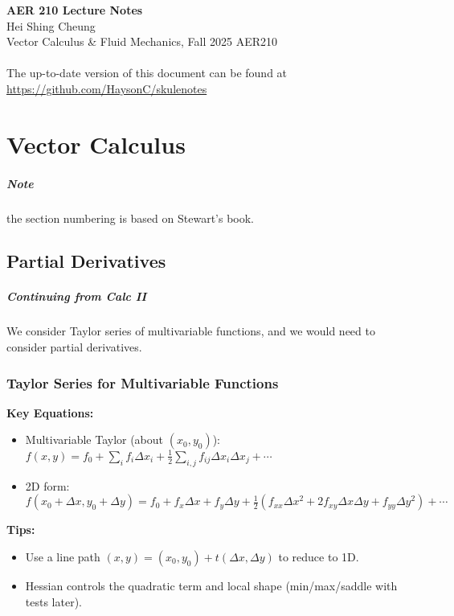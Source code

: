 \documentclass[11pt]{report}
\begin{document}
\thispagestyle{empty}
{\LARGE \bf AER 210 Lecture Notes}\\
{\large Hei Shing Cheung}\\
Vector Calculus \& Fluid Mechanics, Fall 2025 \hfill AER210\\
\\
The up-to-date version of this document can be found at \url{https://github.com/HaysonC/skulenotes}\\

\chapter{Vector Calculus}

\setcounter{section}{13}
\paragraph{Note} the section numbering is based on Stewart's book.

\section{Partial Derivatives}
\paragraph{Continuing from Calc II} We consider Taylor series of multivariable functions, and we would need to consider partial derivatives.

\subsection{Taylor Series for Multivariable Functions}

\begin{keybox}
	\textbf{Key Equations:}
\begin{itemize}
    \item Multivariable Taylor (about $(x_0,y_0)$): $\displaystyle f(x,y) = f_0 + \sum_i f_i\Delta x_i + \tfrac12\sum_{i,j} f_{ij}\Delta x_i\Delta x_j + \cdots$
    \item 2D form: $\displaystyle f(x_0{+}\Delta x,y_0{+}\Delta y) = f_0 + f_x\Delta x + f_y\Delta y + \tfrac12(f_{xx}\Delta x^2 + 2f_{xy}\Delta x\Delta y + f_{yy}\Delta y^2)+\cdots$
\end{itemize}
	\textbf{Tips:}
\begin{itemize}
    \item Use a line path $(x,y)=(x_0,y_0)+t(\Delta x,\Delta y)$ to reduce to 1D.
    \item Hessian controls the quadratic term and local shape (min/max/saddle with tests later).
\end{itemize}
\end{keybox}
\end{document}
